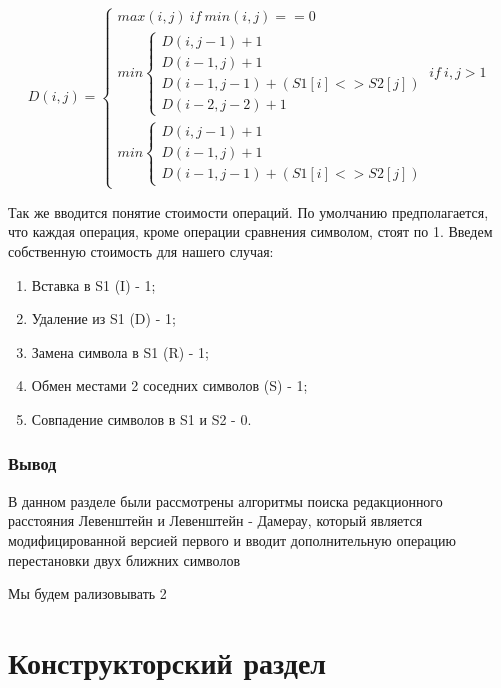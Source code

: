 \documentclass[a4paper, 14pt]{article}
\begin{document}
		\begin{equation}
			D(i,j)=\begin{cases}
			max(i,j)\ if\ min(i,j) == 0\\
			min\begin{cases}
			D(i,j-1) + 1\\
			D(i-1,j) + 1\\
			D(i-1,j-1) + (S1[i] <> S2[j])\\
			D(i-2,j-2) + 1
			\end{cases} \ if \ i,j>1\\
			min\begin{cases}
			D(i,j-1) + 1\\
			D(i-1,j) + 1\\
			D(i-1,j-1) + (S1[i] <> S2[j])
			\end{cases}
			\end{cases}
			\label{for2}					
			\end{equation}

	\vspace{5mm}
	
	Так же вводится понятие стоимости операций. По умолчанию предполагается, что каждая операция, кроме операции сравнения символом, стоят по 1. Введем собственную стоимость для нашего случая:

	\begin{enumerate}
		\item Вставка в S1 (I) - 1;
		\item Удаление из S1 (D) - 1;
		\item Замена символа в S1 (R) - 1;
		\item Обмен местами 2 соседних символов (S) - 1;
		\item Совпадение символов в S1 и S2 - 0.
	\end{enumerate}

	\subsubsection{Вывод}
	
	В данном разделе были рассмотрены алгоритмы поиска редакционного расстояния Левенштейн и Левенштейн - Дамерау, который является модифицированной версией первого и вводит дополнительную операцию перестановки двух ближних символов 
	
	Мы будем рализовывать 2 
	
	\newpage
	\section{Конструкторский раздел}
	
\end{document}
